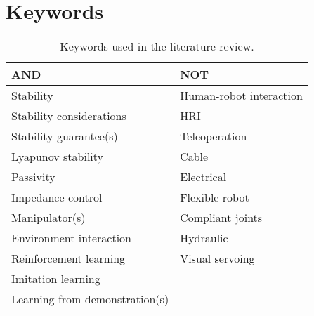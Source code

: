 \chapter{Keywords}
\label{chapter:keywords}

\setlength\extrarowheight{4pt}
\begin{table}[htb]
    \centering
    \caption{Keywords used in the literature review.}
    \label{tab:keywords}
    \begin{tabularx}{0.8\textwidth}{XX}
        \toprule
        AND & NOT \\
        \midrule
        Stability & Human-robot interaction \\
        Stability considerations & HRI \\
        Stability guarantee(s) & Teleoperation \\
        Lyapunov stability & Cable \\
        Passivity & Electrical \\
        Impedance control & Flexible robot \\
        Manipulator(s) & Compliant joints \\
        Environment interaction & Hydraulic \\
        Reinforcement learning & Visual servoing \\
        Imitation learning &  \\
        Learning from demonstration(s) & \\
        \bottomrule
    \end{tabularx}
\end{table}
